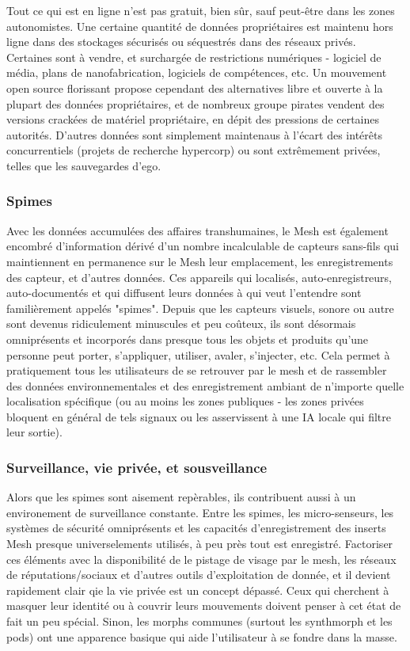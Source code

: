 Tout ce qui est en ligne n'est pas gratuit, bien sûr, sauf peut-être dans les zones autonomistes. Une certaine quantité de données propriétaires est maintenu hors ligne dans des stockages sécurisés ou séquestrés dans des réseaux privés. Certaines sont à vendre, et surchargée de restrictions numériques - logiciel de média, plans de nanofabrication, logiciels de compétences, etc. Un mouvement open source florissant propose cependant des alternatives libre et ouverte à la plupart des données propriétaires, et de nombreux groupe pirates vendent des versions crackées de matériel propriétaire, en dépit des pressions de certaines autorités. D'autres données sont simplement maintenaus à l'écart des intérêts concurrentiels (projets de recherche hypercorp) ou sont extrêmement privées, telles que les sauvegardes d'ego. 

\subsubsection{Spimes} 

Avec les données accumulées des affaires transhumaines, le Mesh est également encombré d'information dérivé d'un nombre incalculable de capteurs sans-fils qui maintiennent en permanence sur le Mesh leur emplacement, les enregistrements des capteur, et d'autres données. Ces appareils qui localisés, auto-enregistreurs, auto-documentés et qui diffusent leurs données à qui veut l'entendre sont familièrement appelés "spimes". Depuis que les capteurs visuels, sonore ou autre sont devenus ridiculement minuscules et peu coûteux, ils sont désormais omniprésents et incorporés dans presque tous les objets et produits qu'une personne peut porter, s'appliquer, utiliser, avaler, s'injecter, etc. Cela permet à pratiquement tous les utilisateurs de se retrouver par le mesh et de rassembler des données environnementales et des enregistrement ambiant de n'importe quelle localisation spécifique (ou au moins les zones publiques - les zones privées bloquent en général de tels signaux ou les asservissent à une IA locale qui filtre leur sortie). 

\subsubsection{Surveillance, vie privée, et sousveillance} 

Alors que les spimes sont aisement repèrables, ils contribuent aussi à un environement de surveillance constante. Entre les spimes, les micro-senseurs, les systèmes de sécurité omniprésents et les capacités d'enregistrement des inserts Mesh presque universelements utilisés, à peu près tout est enregistré. Factoriser ces éléments avec la disponibilité de le pistage de visage par le mesh, les réseaux de réputations/sociaux et d'autres outils d'exploitation de donnée, et il devient rapidement clair qie la vie privée est un concept dépassé. Ceux qui cherchent à masquer leur identité ou à couvrir leurs mouvements doivent penser à cet état de fait un peu spécial. Sinon, les morphs communes (surtout les synthmorph et les pods) ont une apparence basique qui aide l'utilisateur à se fondre dans la masse. 

